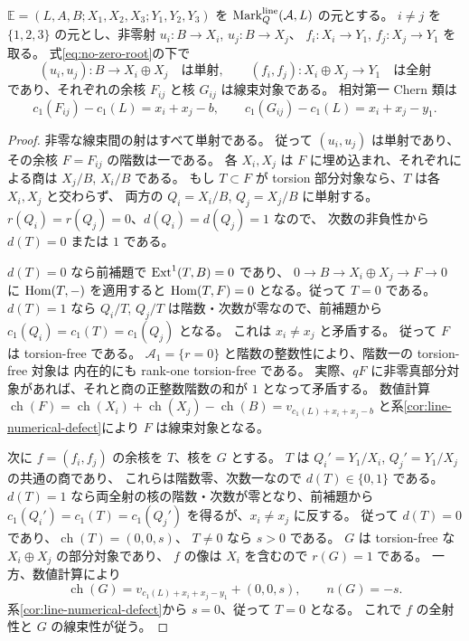 \begin{lemma}[二つの評価写像]\label{lem:cross-two-evaluations}
$\mathbb E=(L,A,B;X_1,X_2,X_3;Y_1,Y_2,Y_3)$ を
$\operatorname{Mark}^{\rm line}_Q(\mathcal A,L)$ の元とする。
$i\ne j$ を $\{1,2,3\}$ の元とし、非零射
$u_i:B\to X_i$, $u_j:B\to X_j$、
$f_i:X_i\to Y_1$, $f_j:X_j\to Y_1$ を取る。
式\eqref{eq:no-zero-root}の下で
\[
 (u_i,u_j):B\longrightarrow X_i\oplus X_j
 \quad\text{は単射},\qquad
 (f_i,f_j):X_i\oplus X_j\longrightarrow Y_1
 \quad\text{は全射}
\]
であり、それぞれの余核 $F_{ij}$ と核 $G_{ij}$ は線束対象である。
相対第一 Chern 類は
\[
 c_1(F_{ij})-c_1(L)=x_i+x_j-b,\qquad
 c_1(G_{ij})-c_1(L)=x_i+x_j-y_1.
\]
\end{lemma}
\begin{proof}
非零な線束間の射はすべて単射である。
従って $(u_i,u_j)$ は単射であり、その余核 $F=F_{ij}$ の階数は一である。
各 $X_i,X_j$ は $F$ に埋め込まれ、それぞれによる商は
$X_j/B$, $X_i/B$ である。
もし $T\subset F$ が torsion 部分対象なら、$T$ は各 $X_i,X_j$ と交わらず、
両方の $Q_i=X_i/B$, $Q_j=X_j/B$ に単射する。
$r(Q_i)=r(Q_j)=0$、$d(Q_i)=d(Q_j)=1$ なので、
次数の非負性から $d(T)=0$ または $1$ である。

$d(T)=0$ なら前補題で $\operatorname{Ext}^1(T,B)=0$ であり、
$0\to B\to X_i\oplus X_j\to F\to0$ に $\operatorname{Hom}(T,-)$ を適用すると
$\operatorname{Hom}(T,F)=0$ となる。従って $T=0$ である。
$d(T)=1$ なら $Q_i/T$, $Q_j/T$ は階数・次数が零なので、前補題から
$c_1(Q_i)=c_1(T)=c_1(Q_j)$ となる。
これは $x_i\ne x_j$ と矛盾する。
従って $F$ は torsion-free である。
$\mathcal A_1=\{r=0\}$ と階数の整数性により、階数一の torsion-free 対象は
内在的にも rank-one torsion-free である。
実際、$qF$ に非零真部分対象があれば、それと商の正整数階数の和が $1$ となって矛盾する。
数値計算
$\operatorname{ch}(F)=\operatorname{ch}(X_i)+\operatorname{ch}(X_j)-\operatorname{ch}(B)
=v_{c_1(L)+x_i+x_j-b}$ と系\ref{cor:line-numerical-defect}により $F$ は線束対象となる。

次に $f=(f_i,f_j)$ の余核を $T$、核を $G$ とする。
$T$ は $Q_i'=Y_1/X_i$, $Q_j'=Y_1/X_j$ の共通の商であり、
これらは階数零、次数一なので $d(T)\in\{0,1\}$ である。
$d(T)=1$ なら両全射の核の階数・次数が零となり、前補題から
$c_1(Q_i')=c_1(T)=c_1(Q_j')$ を得るが、$x_i\ne x_j$ に反する。
従って $d(T)=0$ であり、$\operatorname{ch}(T)=(0,0,s)$、
$T\ne0$ なら $s>0$ である。
$G$ は torsion-free な $X_i\oplus X_j$ の部分対象であり、
$f$ の像は $X_i$ を含むので $r(G)=1$ である。
一方、数値計算により
\[
 \operatorname{ch}(G)
 =v_{c_1(L)+x_i+x_j-y_1}+(0,0,s),\qquad n(G)=-s.
\]
系\ref{cor:line-numerical-defect}から $s=0$、従って $T=0$ となる。
これで $f$ の全射性と $G$ の線束性が従う。
\end{proof}

